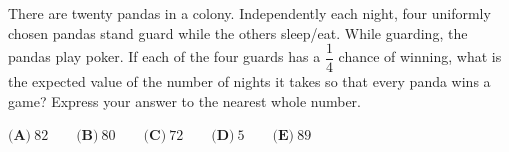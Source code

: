 There are twenty pandas in a colony. Independently each night, four uniformly chosen pandas stand guard while the others sleep/eat. While guarding, the pandas play poker. If each of the four guards has a $\dfrac{1}{4}$ chance of winning, what is the expected value of the number of nights it takes so that every panda wins a game? Express your answer to the nearest whole number.

$\textbf{(A)}~82\qquad\textbf{(B)}~80\qquad\textbf{(C)}~72\qquad\textbf{(D)}~5\qquad\textbf{(E)}~89\qquad$
